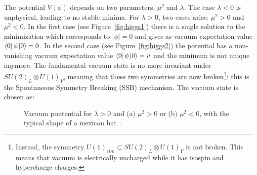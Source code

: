 The potential $V(\phi)$ depends on two parameters, $\mu^2$ and $\lambda$. 
The case $\lambda<0$ is unphysical, leading to no stable minima. For 
$\lambda>0$, two cases arise: $\mu^2>0$ and $\mu^2<0$. In the first case
(see Figure~\ref{fig:higgs1}) there is a single solution to the minimization
which corresponds to $|\phi|=0$ and gives as vacuum expectation value
$\bra{0}\phi \ket{0} = 0$. In the second case (see Figure~\ref{fig:higgs2}) 
the potential has a non-vanishing vacuum expectation value 
$\bra{0}\phi \ket{0} = v$ and %
the minimum is not unique anymore. The fundamental vacuum 
state is no more invariant under $SU(2)_{L} \otimes U(1)_{Y}$, 
meaning that these two symmetries are now 
broken\footnote{Instead, the symmetry $U(1)_{elm} \subset SU(2)_{L} \otimes U(1)_{Y}$ 
is not broken. This means that vacuum is electrically uncharged while 
it has isospin and hypercharge charges.}: 
this is the Spontaneous Symmetry Breaking (SSB) mechanism. 
The vacuum state is chosen as:
\begin{figure}[htb]\begin{center}
	\caption{Vacuum pontential for $\lambda>0$ and (a) $\mu^2>0$ or
          (b) $\mu^2<0$, with the typical shape of a mexican hat~\cite{Michael:1569839}.}
\end{center}\end{figure}

